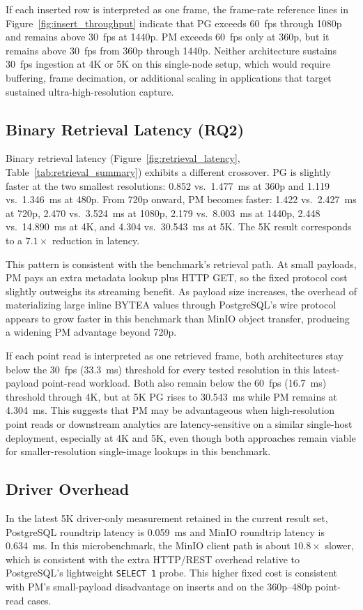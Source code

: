 \documentclass[conference]{IEEEtran}
\begin{document}
If each inserted row is interpreted as one frame, the frame-rate reference lines in Figure~\ref{fig:insert_throughput} indicate that PG exceeds 60~fps through 1080p and remains above 30~fps at 1440p. PM exceeds 60~fps only at 360p, but it remains above 30~fps from 360p through 1440p. Neither architecture sustains 30~fps ingestion at 4K or 5K on this single-node setup, which would require buffering, frame decimation, or additional scaling in applications that target sustained ultra-high-resolution capture.

\subsection{Binary Retrieval Latency (RQ2)}
\label{subsec:retrieval_latency}
Binary retrieval latency (Figure~\ref{fig:retrieval_latency}, Table~\ref{tab:retrieval_summary}) exhibits a different crossover. PG is slightly faster at the two smallest resolutions: 0.852 vs.\ 1.477~ms at 360p and 1.119 vs.\ 1.346~ms at 480p. From 720p onward, PM becomes faster: 1.422 vs.\ 2.427~ms at 720p, 2.470 vs.\ 3.524~ms at 1080p, 2.179 vs.\ 8.003~ms at 1440p, 2.448 vs.\ 14.890~ms at 4K, and 4.304 vs.\ 30.543~ms at 5K. The 5K result corresponds to a $7.1\times$ reduction in latency.

This pattern is consistent with the benchmark's retrieval path. At small payloads, PM pays an extra metadata lookup plus HTTP GET, so the fixed protocol cost slightly outweighs its streaming benefit. As payload size increases, the overhead of materializing large inline BYTEA values through PostgreSQL's wire protocol appears to grow faster in this benchmark than MinIO object transfer, producing a widening PM advantage beyond 720p.

If each point read is interpreted as one retrieved frame, both architectures stay below the 30~fps (33.3~ms) threshold for every tested resolution in this latest-payload point-read workload. Both also remain below the 60~fps (16.7~ms) threshold through 4K, but at 5K PG rises to 30.543~ms while PM remains at 4.304~ms. This suggests that PM may be advantageous when high-resolution point reads or downstream analytics are latency-sensitive on a similar single-host deployment, especially at 4K and 5K, even though both approaches remain viable for smaller-resolution single-image lookups in this benchmark.

\subsection{Driver Overhead}
\label{subsec:driver_overhead}
In the latest 5K driver-only measurement retained in the current result set, PostgreSQL roundtrip latency is 0.059~ms and MinIO roundtrip latency is 0.634~ms. In this microbenchmark, the MinIO client path is about $10.8\times$ slower, which is consistent with the extra HTTP/REST overhead relative to PostgreSQL's lightweight \texttt{SELECT 1} probe. This higher fixed cost is consistent with PM's small-payload disadvantage on inserts and on the 360p--480p point-read cases.
\end{document}
